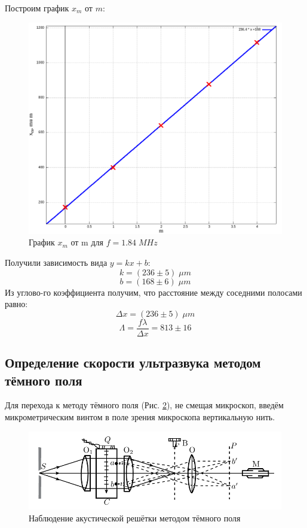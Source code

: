\documentclass{article}
\begin{document}
Построим график \(x_m\) от \(m\):
\begin{figure}[H]
  \centering
  \includegraphics[width=\textwidth]{1840KHz.png}
  \caption{График \(x_m\) от m для \(f = 1.84\; MHz\)}
  \label{fig:1840KHz}
\end{figure}

Получили зависимость вида \(y = kx + b\):
\[ k = (236 \pm 5)\; \mu m \]
\[ b = (168 \pm 6)\; \mu m \]
Из углово-го коэффициента получим, что расстояние между соседними полосами равно:
\[ \Delta x = (236 \pm 5)\; \mu m \]
\[ \Lambda = \frac{f\lambda}{\Delta x} = 813 \pm 16 \]

\subsection{Определение скорости ультразвука методом тёмного поля}
Для перехода к методу тёмного поля (Рис. \ref{fig:dark-scheme}), не смещая микроскоп,
введём микрометрическим винтом в поле зрения микроскопа вертикальную нить.
\begin{figure}[H]
  \centering
  \includegraphics[width=\textwidth]{dark-scheme.png}
  \caption{Наблюдение акустической решётки методом тёмного поля}
  \label{fig:dark-scheme}
\end{figure}
\end{document}
